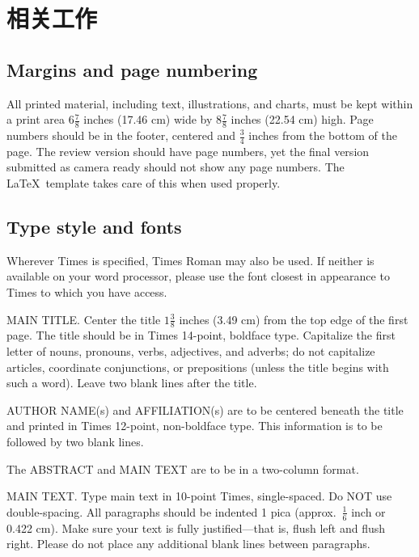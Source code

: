 \documentclass[10pt,twocolumn,letterpaper]{article}
\begin{document}
\section{相关工作}
\label{sec:formatting}


\subsection{Margins and page numbering}

All printed material, including text, illustrations, and charts, must be kept
within a print area $6\frac{7}{8}$ inches (17.46 cm) wide by $8\frac{7}{8}$ inches (22.54 cm)
high.
%
Page numbers should be in the footer, centered and $\frac{3}{4}$ inches from the bottom of the page.
The review version should have page numbers, yet the final version submitted as camera ready should not show any page numbers.
The \LaTeX\ template takes care of this when used properly.



\subsection{Type style and fonts}

Wherever Times is specified, Times Roman may also be used.
If neither is available on your word processor, please use the font closest in
appearance to Times to which you have access.

MAIN TITLE.
Center the title $1\frac{3}{8}$ inches (3.49 cm) from the top edge of the first page.
The title should be in Times 14-point, boldface type.
Capitalize the first letter of nouns, pronouns, verbs, adjectives, and adverbs;
do not capitalize articles, coordinate conjunctions, or prepositions (unless the title begins with such a word).
Leave two blank lines after the title.

AUTHOR NAME(s) and AFFILIATION(s) are to be centered beneath the title
and printed in Times 12-point, non-boldface type.
This information is to be followed by two blank lines.

The ABSTRACT and MAIN TEXT are to be in a two-column format.

MAIN TEXT.
Type main text in 10-point Times, single-spaced.
Do NOT use double-spacing.
All paragraphs should be indented 1 pica (approx.~$\frac{1}{6}$ inch or 0.422 cm).
Make sure your text is fully justified---that is, flush left and flush right.
Please do not place any additional blank lines between paragraphs.
\end{document}
